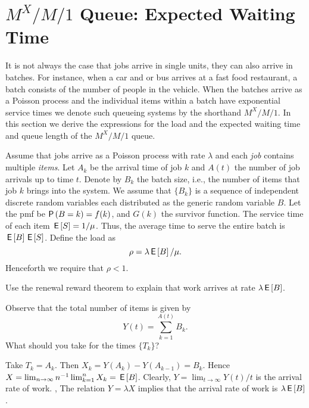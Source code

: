 \section
{$M^X/M/1$ Queue: Expected Waiting Time}
\label{sec:mxm1-queue:-expected}



It is not always the case that jobs arrive in single units, they can also arrive in batches.
For instance, when a car and or bus arrives at a fast food restaurant, a batch consists of the number of people in the vehicle.
When the batches arrive as a Poisson process and the individual items within a batch have exponential service times we denote such queueing systems by the shorthand $M^X/M/1$.
In this section we derive the expressions for the load and the expected waiting time and queue length of the $M^X/M/1$ queue.


Assume that jobs arrive as a Poisson process with rate $\lambda$ and each \emph{job} contains multiple \emph{items}.
Let $A_k$ be the arrival time of job $k$ and $A(t)$ the number of job arrivals up to time $t$.
Denote by $B_k$ the batch size, i.e., the number of items that job $k$ brings into the system.
We assume that $\{B_k\}$ is a sequence of independent discrete random variables each distributed as the generic random variable $B$.
Let the pmf be $\P{B = k} = f(k)$, and $G(k)$ the survivor function.
The service time of each item $\,\mathsf{E}\left[S\right] = 1/\mu$.
Thus, the average time to serve the entire batch is $\,\mathsf{E}\left[B\right] \,\mathsf{E}\left[S\right]$.
 Define the load as
\begin{equation*}
\rho = \lambda \,\mathsf{E}\left[B\right]/\mu.
\end{equation*}
Henceforth we require that $\rho< 1$.


\begin{exercise} Use the renewal reward theorem to explain that work arrives at rate $\lambda \,\mathsf{E}\left[B\right]$.
  \begin{hint}
Observe that the total number of items is given by
\begin{equation*}
Y(t)=  \sum_{k=1}^{A(t)} B_k.
\end{equation*}
What should you take for the times $\{T_k\}$? 
  \end{hint}
\begin{solution}
Take $T_k = A_k$. Then $X_k = Y(A_k) - Y(A_{k-1}) = B_k$.  Hence $X = \lim_{n\to\infty} n^{-1} \lim_{k=1}^n X_k = \,\mathsf{E}\left[B\right]$. Clearly, $Y = \lim_{t\to\infty} Y(t)/t$ is the arrival rate of work. , The relation $Y=\lambda  X$ implies that the arrival rate of work is $\lambda \,\mathsf{E}\left[B\right]$. 
\end{solution}
\end{exercise}


